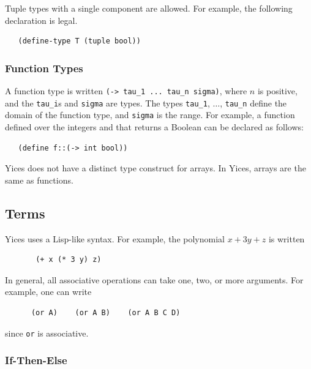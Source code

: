 \documentclass[11pt,twoside,fleqn,openright,titlepage]{cslreport}
\begin{document}
\medskip\noindent   Tuple  types   with  a   single   component  are
allowed. For example, the following declaration is legal.
\begin{small}
\begin{verbatim}
   (define-type T (tuple bool))
\end{verbatim}
\end{small}

\subsubsection*{Function Types}

A function type is written \texttt{(-> tau\_1 ...  tau\_n
  sigma)}, where $n$ is positive, and the \texttt{tau\_i}s and
\texttt{sigma} are types.  The types \texttt{tau\_1}, $\ldots$,
\texttt{tau\_n} define the domain of the function type, and
\texttt{sigma} is the range.  For example, a function defined over
the integers and that returns a Boolean can be declared as follows:
\begin{small}
\begin{verbatim}
   (define f::(-> int bool))
\end{verbatim}
\end{small}

\medskip\noindent Yices does not  have a distinct type construct for
arrays. In Yices, arrays are the same as functions.


\subsection{Terms}

Yices uses a Lisp-like syntax. For example, the polynomial $x + 3y +
z$ is written
\begin{small}
\begin{verbatim}
       (+ x (* 3 y) z)
\end{verbatim}
\end{small}
In general, all associative operations can take one, two, or more
arguments. For example, one can write
\begin{small}
\begin{verbatim}
      (or A)    (or A B)    (or A B C D)
\end{verbatim}
\end{small}
since \texttt{or} is associative.


\subsubsection*{If-Then-Else}
\end{document}
